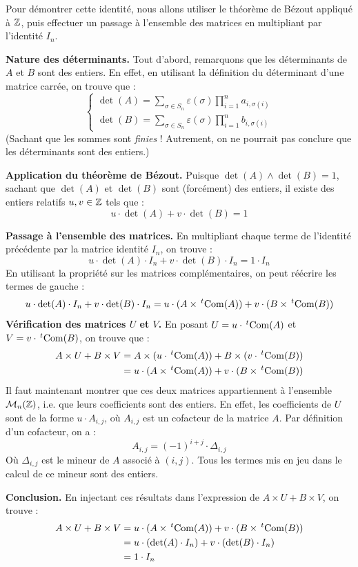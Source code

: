 \documentclass[12pt, a4paper]{report}
\begin{document}
\begin{outline}
    Pour démontrer cette identité, nous allons utiliser le théorème de Bézout appliqué à $\mathbb{Z}$, puis effectuer un passage à l'ensemble des matrices en multipliant par l'identité $I_n$.

    \1 \textbf{Nature des déterminants.} Tout d'abord, remarquons que les déterminants de $A$ et $B$ sont des entiers. En effet, en utilisant la définition du déterminant d'une matrice carrée, on trouve que :
    $$\begin{cases}
    \det(A) = \sum_{\sigma \in S_n} \varepsilon(\sigma) \prod_{i=1}^n a_{i,\sigma(i)} \\
    \det(B) = \sum_{\sigma \in S_n} \varepsilon(\sigma) \prod_{i=1}^n b_{i,\sigma(i)}
    \end{cases}$$
    (Sachant que les sommes sont \textit{finies} ! Autrement, on ne pourrait pas conclure que les déterminants sont des entiers.)

    \1 \textbf{Application du théorème de Bézout.} Puisque $\det(A)\wedge \det(B) = 1$, sachant que $\det(A)$ et $\det(B)$ sont (forcément) des entiers, il existe des entiers relatifs $u,v \in \mathbb{Z}$ tels que :
    $$u \cdot \det(A) + v \cdot \det(B) = 1$$

    \1 \textbf{Passage à l'ensemble des matrices.} En multipliant chaque terme de l'identité précédente par la matrice identité $I_n$, on trouve :
    $$u \cdot \det(A) \cdot I_n + v \cdot \det(B) \cdot I_n = 1 \cdot I_n$$
    En utilisant la propriété sur les matrices complémentaires, on peut réécrire les termes de gauche :
    $$
        u \cdot \det(A) \cdot I_n + v \cdot \det(B) \cdot I_n = u \cdot (A \times \,^t\mathrm{Com}(A)) + v \cdot (B \times \,^t\mathrm{Com}(B))
    $$
    \1 \textbf{Vérification des matrices $U$ et $V$.} En posant $U = u \cdot \,^t\mathrm{Com}(A)$ et $V = v \cdot \,^t\mathrm{Com}(B)$, on trouve que :
    \begin{align*}
        A \times U + B \times V &= A \times (u \cdot \,^t\mathrm{Com}(A)) + B \times (v \cdot \,^t\mathrm{Com}(B)) \\
        &= u \cdot (A \times \,^t\mathrm{Com}(A)) + v \cdot (B \times \,^t\mathrm{Com}(B))
    \end{align*}
    Il faut maintenant montrer que ces deux matrices appartiennent à l'ensemble $\mathcal{M}_n(\mathbb{Z})$, i.e. que leurs coefficients sont des entiers. En effet, les coefficients de $U$ sont de la forme $u \cdot A_{i,j}$, où $A_{i,j}$ est un cofacteur de la matrice $A$. Par définition d'un cofacteur, on a :
    $$A_{i,j} = (-1)^{i+j} \cdot \Delta_{i,j}$$
    Où $\Delta_{i,j}$ est le mineur de $A$ associé à $(i,j)$. Tous les termes mis en jeu dans le calcul de ce mineur sont des entiers.

    \1 \textbf{Conclusion.} En injectant ces résultats dans l'expression de $A \times U + B \times V$, on trouve :
    \begin{align*}
        A \times U + B \times V &= u \cdot (A \times \,^t\mathrm{Com}(A)) + v \cdot (B \times \,^t\mathrm{Com}(B)) \\
        &= u \cdot (\det(A) \cdot I_n) + v \cdot (\det(B) \cdot I_n)
        \\&= 1 \cdot I_n
    \end{align*}
\end{outline}
\end{document}
